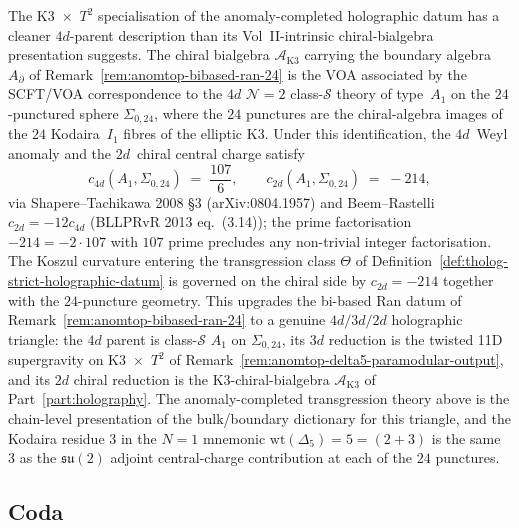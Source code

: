 \begin{remark}
\label{rem:anomtop-class-s-a1-sigma024}
The K3~$\times$~$T^{2}$ specialisation of the anomaly-completed
holographic datum has a cleaner $4d$-parent description than its
Vol~II-intrinsic chiral-bialgebra presentation suggests.
The chiral bialgebra $\mathcal A_{\mathrm{K3}}$ carrying the
boundary algebra $A_{\partial}$ of
Remark~\ref{rem:anomtop-bibased-ran-24} is the VOA associated
by the SCFT/VOA correspondence to the $4d$ $\mathcal N=2$
class-$\mathcal S$ theory of type~$A_{1}$ on the
$24$-punctured sphere $\Sigma_{0,24}$, where the $24$ punctures
are the chiral-algebra images of the $24$ Kodaira~$I_{1}$
fibres of the elliptic K3. Under this identification, the
$4d$~Weyl anomaly and the $2d$~chiral central charge satisfy
\[
c_{4d}(A_{1},\Sigma_{0,24})
\;=\;
\frac{107}{6},
\qquad
c_{2d}(A_{1},\Sigma_{0,24})
\;=\;
-214,
\]
via Shapere--Tachikawa 2008 \S 3 (arXiv:0804.1957) and
Beem--Rastelli $c_{2d} = -12 c_{4d}$ (BLLPRvR 2013 eq.~(3.14));
the prime factorisation $-214 = -2 \cdot 107$ with $107$ prime
precludes any non-trivial integer factorisation. The Koszul
curvature entering the transgression class
$\Theta$ of Definition~\ref{def:tholog-strict-holographic-datum}
is governed on the chiral side by $c_{2d}=-214$ together with
the $24$-puncture geometry. This upgrades the bi-based Ran
datum of Remark~\ref{rem:anomtop-bibased-ran-24} to a
genuine $4d/3d/2d$ holographic triangle: the $4d$ parent is
class-$\mathcal S$ $A_{1}$ on $\Sigma_{0,24}$, its $3d$
reduction is the twisted 11D supergravity on K3~$\times$~$T^{2}$
of Remark~\ref{rem:anomtop-delta5-paramodular-output}, and
its $2d$ chiral reduction is the K3-chiral-bialgebra
$\mathcal A_{\mathrm{K3}}$ of Part~\ref{part:holography}. The
anomaly-completed transgression theory above is the chain-level
presentation of the bulk/boundary dictionary for this
triangle, and the Kodaira residue $3$ in the $N=1$ mnemonic
$\mathrm{wt}(\Delta_{5})=5=(2+3)$ is the same $3$ as the
$\mathfrak{su}(2)$ adjoint central-charge contribution at
each of the $24$ punctures.
\end{remark}

\subsection{Coda}

